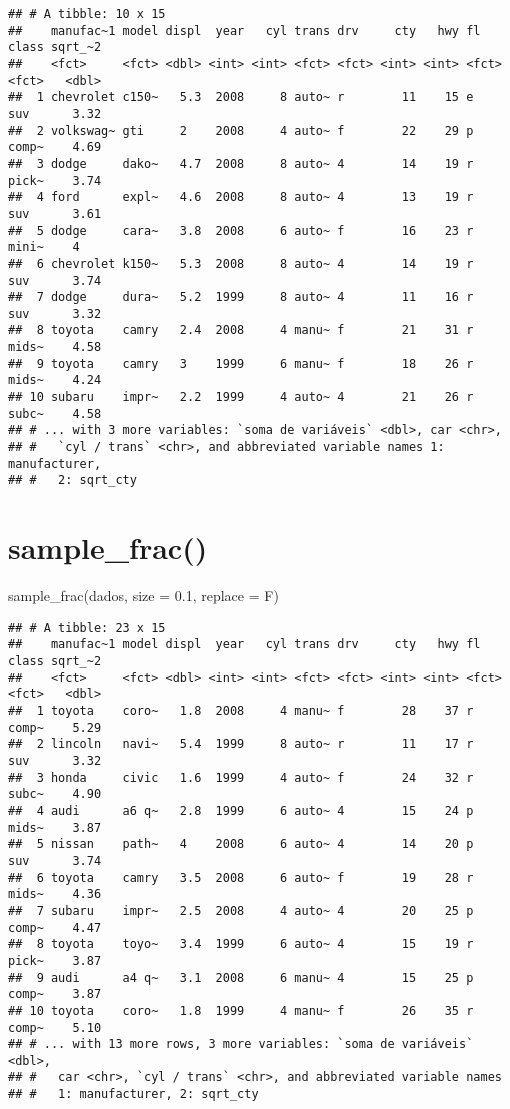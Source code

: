 \documentclass[
]{book}
\newenvironment{Shaded}{\begin{snugshade}}{\end{snugshade}}
\newcommand{\AttributeTok}[1]{\textcolor[rgb]{0.77,0.63,0.00}{#1}}
\newcommand{\FloatTok}[1]{\textcolor[rgb]{0.00,0.00,0.81}{#1}}
\newcommand{\FunctionTok}[1]{\textcolor[rgb]{0.00,0.00,0.00}{#1}}
\newcommand{\NormalTok}[1]{#1}
\begin{document}
\begin{verbatim}
## # A tibble: 10 x 15
##    manufac~1 model displ  year   cyl trans drv     cty   hwy fl    class sqrt_~2
##    <fct>     <fct> <dbl> <int> <int> <fct> <fct> <int> <int> <fct> <fct>   <dbl>
##  1 chevrolet c150~   5.3  2008     8 auto~ r        11    15 e     suv      3.32
##  2 volkswag~ gti     2    2008     4 auto~ f        22    29 p     comp~    4.69
##  3 dodge     dako~   4.7  2008     8 auto~ 4        14    19 r     pick~    3.74
##  4 ford      expl~   4.6  2008     8 auto~ 4        13    19 r     suv      3.61
##  5 dodge     cara~   3.8  2008     6 auto~ f        16    23 r     mini~    4   
##  6 chevrolet k150~   5.3  2008     8 auto~ 4        14    19 r     suv      3.74
##  7 dodge     dura~   5.2  1999     8 auto~ 4        11    16 r     suv      3.32
##  8 toyota    camry   2.4  2008     4 manu~ f        21    31 r     mids~    4.58
##  9 toyota    camry   3    1999     6 manu~ f        18    26 r     mids~    4.24
## 10 subaru    impr~   2.2  1999     4 auto~ 4        21    26 r     subc~    4.58
## # ... with 3 more variables: `soma de variáveis` <dbl>, car <chr>,
## #   `cyl / trans` <chr>, and abbreviated variable names 1: manufacturer,
## #   2: sqrt_cty
\end{verbatim}

\hypertarget{sample_frac}{%
\section{sample\_frac()}\label{sample_frac}}

\begin{Shaded}
\begin{Highlighting}[]
\FunctionTok{sample\_frac}\NormalTok{(dados, }\AttributeTok{size =} \FloatTok{0.1}\NormalTok{, }\AttributeTok{replace =}\NormalTok{ F)}
\end{Highlighting}
\end{Shaded}

\begin{verbatim}
## # A tibble: 23 x 15
##    manufac~1 model displ  year   cyl trans drv     cty   hwy fl    class sqrt_~2
##    <fct>     <fct> <dbl> <int> <int> <fct> <fct> <int> <int> <fct> <fct>   <dbl>
##  1 toyota    coro~   1.8  2008     4 manu~ f        28    37 r     comp~    5.29
##  2 lincoln   navi~   5.4  1999     8 auto~ r        11    17 r     suv      3.32
##  3 honda     civic   1.6  1999     4 auto~ f        24    32 r     subc~    4.90
##  4 audi      a6 q~   2.8  1999     6 auto~ 4        15    24 p     mids~    3.87
##  5 nissan    path~   4    2008     6 auto~ 4        14    20 p     suv      3.74
##  6 toyota    camry   3.5  2008     6 auto~ f        19    28 r     mids~    4.36
##  7 subaru    impr~   2.5  2008     4 auto~ 4        20    25 p     comp~    4.47
##  8 toyota    toyo~   3.4  1999     6 auto~ 4        15    19 r     pick~    3.87
##  9 audi      a4 q~   3.1  2008     6 manu~ 4        15    25 p     comp~    3.87
## 10 toyota    coro~   1.8  1999     4 manu~ f        26    35 r     comp~    5.10
## # ... with 13 more rows, 3 more variables: `soma de variáveis` <dbl>,
## #   car <chr>, `cyl / trans` <chr>, and abbreviated variable names
## #   1: manufacturer, 2: sqrt_cty
\end{verbatim}
\end{document}
